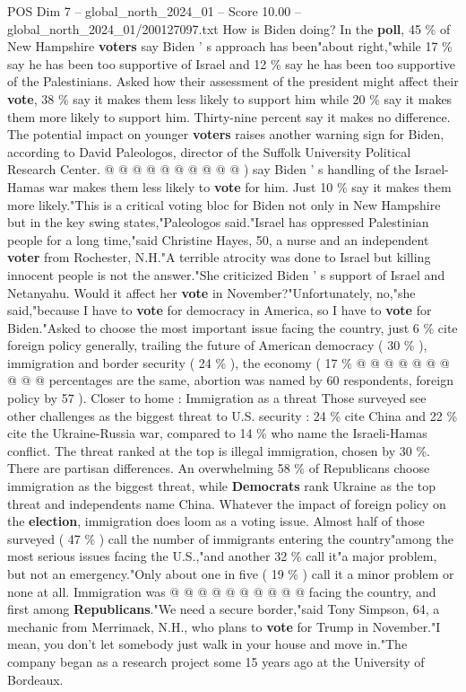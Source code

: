 \begin{textsample}{POS Dim 7 – global\_north\_2024\_01 – Score 10.00 – global\_north\_2024\_01/200127097.txt}
How is Biden doing?
In the \textbf{poll}, 45 \% of New Hampshire \textbf{voters} say Biden ' s approach has been"about right,"while 17 \% say he has been too supportive of Israel and 12 \% say he has been too supportive of the Palestinians.
Asked how their assessment of the president might affect their \textbf{vote}, 38 \% say it makes them less likely to support him while 20 \% say it makes them more likely to support him.
Thirty-nine percent say it makes no difference.
The potential impact on younger \textbf{voters} raises another warning sign for Biden, according to David Paleologos, director of the Suffolk University Political Research Center. @ @ @ @ @ @ @ @ @ @ ) say Biden ' s handling of the Israel-Hamas war makes them less likely to \textbf{vote} for him.
Just 10 \% say it makes them more likely."This is a critical voting bloc for Biden not only in New Hampshire but in the key swing states,"Paleologos said."Israel has oppressed Palestinian people for a long time,"said Christine Hayes, 50, a nurse and an independent \textbf{voter} from Rochester, N.H."A terrible atrocity was done to Israel but killing innocent people is not the answer."She criticized Biden ' s support of Israel and Netanyahu.
Would it affect her \textbf{vote} in November?"Unfortunately, no,"she said,"because I have to \textbf{vote} for democracy in America, so I have to \textbf{vote} for Biden."Asked to choose the most important issue facing the country, just 6 \% cite foreign policy generally, trailing the future of American democracy ( 30 \% ), immigration and border security ( 24 \% ), the economy ( 17 \% @ @ @ @ @ @ @ @ @ @ percentages are the same, abortion was named by 60 respondents, foreign policy by 57 ).
Closer to home : Immigration as a threat Those surveyed see other challenges as the biggest threat to U.S. security : 24 \% cite China and 22 \% cite the Ukraine-Russia war, compared to 14 \% who name the Israeli-Hamas conflict.
The threat ranked at the top is illegal immigration, chosen by 30 \%.
There are partisan differences.
An overwhelming 58 \% of Republicans choose immigration as the biggest threat, while \textbf{Democrats} rank Ukraine as the top threat and independents name China.
Whatever the impact of foreign policy on the \textbf{election}, immigration does loom as a voting issue.
Almost half of those surveyed ( 47 \% ) call the number of immigrants entering the country"among the most serious issues facing the U.S.,"and another 32 \% call it"a major problem, but not an emergency."Only about one in five ( 19 \% ) call it a minor problem or none at all.
Immigration was @ @ @ @ @ @ @ @ @ @ facing the country, and first among \textbf{Republicans}."We need a secure border,"said Tony Simpson, 64, a mechanic from Merrimack, N.H., who plans to \textbf{vote} for Trump in November."I mean, you don't let somebody just walk in your house and move in."The company began as a research project some 15 years ago at the University of Bordeaux.

\end{textsample}

